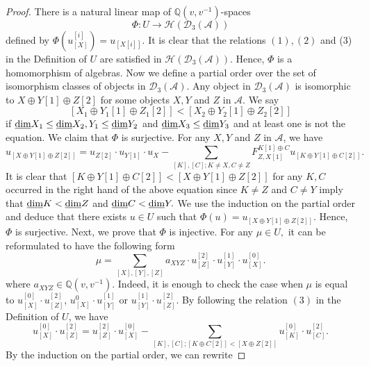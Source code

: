 \documentclass{amsart}
\theoremstyle{definition}
\numberwithin{equation}{section}
\begin{document}
\begin{proof}
There is a natural linear map of ${{\mathbb Q}}(v, v^{-1})$-spaces
$$
\Phi:U\rightarrow \mathcal{H}({{\mathcal{D}}}_3(\mathcal{A}))
$$
defined by $\Phi(u^{[i]}_{[X]})=u_{[X[i]]}.$ It is clear that the
relations $(1), (2)$ and (3) in the Definition of $U$ are satisfied
in $\mathcal{H}({{\mathcal{D}}}_3(\mathcal{A}))$. Hence, $\Phi$ is a
homomorphism of algebras. Now we define a partial order over the set
of isomorphism classes of objects in ${{\mathcal{D}}}_3(\mathcal{A})$. Any
object in ${{\mathcal{D}}}_3(\mathcal{A})$ is isomorphic to $X\oplus Y[1]\oplus
Z[2]$ for some objects $X, Y$ and $Z$ in $\mathcal{A}$. We say
$$[X_1\oplus Y_1[1]\oplus Z_1[2]]< [X_2\oplus Y_2[1]\oplus Z_2[2]]$$ if
${\mbox{\underline {dim}}} X_1\leq {\mbox{\underline {dim}}} X_2, Y_1\leq {\mbox{\underline {dim}}} Y_2$ and ${\mbox{\underline {dim}}} X_3\leq
{\mbox{\underline {dim}}} Y_3$ and at least one is not the equation. We claim that
$\Phi$ is surjective. For any $X, Y$ and $Z$ in $\mathcal{A}$, we
have
\begin{equation}\label{expression2}
u_{[X\oplus Y[1]\oplus Z[2]]}=u_{Z[2]}\cdot u_{Y[1]}\cdot u_X
-\sum_{[K],[C]; K\neq X, C\neq Z}F_{Z, X[1]}^{K[1]\oplus
C}u_{[K\oplus Y[1]\oplus C[2]]}.
\end{equation}
It is clear that $[K\oplus Y[1]\oplus C[2]]< [X\oplus Y[1]\oplus
Z[2]]$ for any $K, C$ occurred  in the right hand of the above
equation since $K\neq Z$ and $C\neq Y$ imply that ${\mbox{\underline {dim}}} K<{\mbox{\underline {dim}}} Z$
and ${\mbox{\underline {dim}}} C<{\mbox{\underline {dim}}} Y.$ We use the induction on the partial order and
deduce that there exists $u\in U$ such that $\Phi(u)=u_{[X\oplus
Y[1]\oplus Z[2]]}.$ Hence, $\Phi$ is surjective. Next, we prove that
$\Phi$ is injective. For any $\mu\in U,$ it can be reformulated to
have the following form
\begin{equation}\label{expression}
\mu=\sum_{[X], [Y], [Z]}a_{XYZ}\cdot u_{[Z]}^{[2]}\cdot
u_{[Y]}^{[1]}\cdot u_{[X]}^{[0]}.
\end{equation}
where $a_{XYZ}\in {{\mathbb Q}}(v, v^{-1})$. Indeed, it is enough to check
the case when $\mu$ is equal to $u_{[X]}^{[0]}\cdot u_{[Z]}^{[2]}$,
$u_{[X]}^{0}\cdot u_{[Y]}^{[1]}$ or $u_{[Y]}^{[1]}\cdot
u_{[Z]}^{[2]}$. By following the relation $(3)$ in the Definition of
$U$, we have
$$
u_{[X]}^{[0]}\cdot u_{[Z]}^{[2]}=u_{[Z]}^{[2]}\cdot
u_{[X]}^{[0]}-\sum_{[K], [C]; [K\oplus C[2]]<[X\oplus
Z[2]]}u_{[K]}^{[0]}\cdot u_{[C]}^{[2]}.
$$
By the induction on the partial order, we can rewrite

\end{proof}
\end{document}
